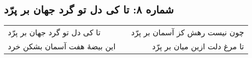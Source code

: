 \begin{center}
\section*{شماره ۸: تا کی دل تو گرد جهان بر پرّد}
\label{sec:008}
\begin{longtable}{l p{0.5cm} r}
تا کی دل تو گرد جهان بر پرّد
&&
چون نیست رهش کز آسمان بر پرّد
\\
این بیضهٔ هفت آسمان بشکن خرد
&&
تا مرغ دلت ازین میان بر پرّد
\\
\end{longtable}
\end{center}

